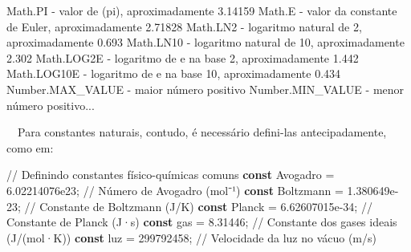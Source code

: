 \documentclass[
  portuguese,
  letterpaper,
  DIV=11,
  numbers=noendperiod]{scrreprt}
\newenvironment{Shaded}{\begin{snugshade}}{\end{snugshade}}
\newcommand{\BuiltInTok}[1]{\textcolor[rgb]{0.00,0.23,0.31}{#1}}
\newcommand{\CommentTok}[1]{\textcolor[rgb]{0.37,0.37,0.37}{#1}}
\newcommand{\ConstantTok}[1]{\textcolor[rgb]{0.56,0.35,0.01}{#1}}
\newcommand{\DecValTok}[1]{\textcolor[rgb]{0.68,0.00,0.00}{#1}}
\newcommand{\FloatTok}[1]{\textcolor[rgb]{0.68,0.00,0.00}{#1}}
\newcommand{\FunctionTok}[1]{\textcolor[rgb]{0.28,0.35,0.67}{#1}}
\newcommand{\KeywordTok}[1]{\textcolor[rgb]{0.00,0.23,0.31}{\textbf{#1}}}
\newcommand{\NormalTok}[1]{\textcolor[rgb]{0.00,0.23,0.31}{#1}}
\newcommand{\OperatorTok}[1]{\textcolor[rgb]{0.37,0.37,0.37}{#1}}
\begin{document}
\begin{Shaded}
\begin{Highlighting}[]
\BuiltInTok{Math}\OperatorTok{.}\ConstantTok{PI} \OperatorTok{{-}}\NormalTok{ valor }\FunctionTok{de}\NormalTok{ (pi)}\OperatorTok{,}\NormalTok{ aproximadamente }\FloatTok{3.14159}
\BuiltInTok{Math}\OperatorTok{.}\ConstantTok{E} \OperatorTok{{-}}\NormalTok{ valor da constante de Euler}\OperatorTok{,}\NormalTok{ aproximadamente }\FloatTok{2.71828}
\BuiltInTok{Math}\OperatorTok{.}\ConstantTok{LN2} \OperatorTok{{-}}\NormalTok{ logaritmo natural de }\DecValTok{2}\OperatorTok{,}\NormalTok{ aproximadamente }\FloatTok{0.693}
\BuiltInTok{Math}\OperatorTok{.}\ConstantTok{LN10} \OperatorTok{{-}}\NormalTok{ logaritmo natural de }\DecValTok{10}\OperatorTok{,}\NormalTok{ aproximadamente }\FloatTok{2.302}
\BuiltInTok{Math}\OperatorTok{.}\ConstantTok{LOG2E} \OperatorTok{{-}}\NormalTok{ logaritmo de e na base }\DecValTok{2}\OperatorTok{,}\NormalTok{ aproximadamente }\FloatTok{1.442}
\BuiltInTok{Math}\OperatorTok{.}\ConstantTok{LOG10E} \OperatorTok{{-}}\NormalTok{ logaritmo de e na base }\DecValTok{10}\OperatorTok{,}\NormalTok{ aproximadamente }\FloatTok{0.434}
\BuiltInTok{Number}\OperatorTok{.}\ConstantTok{MAX\_VALUE} \OperatorTok{{-}}\NormalTok{ maior número positivo}
\BuiltInTok{Number}\OperatorTok{.}\ConstantTok{MIN\_VALUE} \OperatorTok{{-}}\NormalTok{ menor número positivo}\OperatorTok{...}
\end{Highlighting}
\end{Shaded}

~~Para constantes naturais, contudo, é necessário defini-las
antecipadamente, como em:

\begin{Shaded}
\begin{Highlighting}[]
\CommentTok{// Definindo constantes físico{-}químicas comuns}
\KeywordTok{const}\NormalTok{ Avogadro }\OperatorTok{=} \FloatTok{6.02214076e23}\OperatorTok{;}  \CommentTok{// Número de Avogadro (mol⁻¹)}
\KeywordTok{const}\NormalTok{ Boltzmann }\OperatorTok{=} \FloatTok{1.380649e{-}23}\OperatorTok{;}  \CommentTok{// Constante de Boltzmann (J/K)}
\KeywordTok{const}\NormalTok{ Planck }\OperatorTok{=} \FloatTok{6.62607015e{-}34}\OperatorTok{;}   \CommentTok{// Constante de Planck (J·s)}
\KeywordTok{const}\NormalTok{ gas }\OperatorTok{=} \FloatTok{8.31446}\OperatorTok{;}    \CommentTok{// Constante dos gases ideais (J/(mol·K))}
\KeywordTok{const}\NormalTok{ luz }\OperatorTok{=} \DecValTok{299792458}\OperatorTok{;} \CommentTok{// Velocidade da luz no vácuo (m/s)}
\end{Highlighting}
\end{Shaded}
\end{document}
